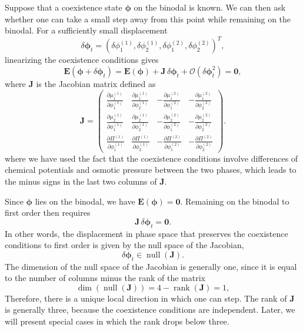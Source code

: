 \documentclass[12pt]{article}
\begin{document}
Suppose that a coexistence state \(\boldsymbol{\phi}\) on the binodal is known. We can then ask whether one can take a small step away from this point while remaining on the binodal.
For a sufficiently small displacement
\[
\delta\boldsymbol{\phi}_t
=
(\delta\phi_1^{(1)}, \delta\phi_2^{(1)}, \delta\phi_1^{(2)}, \delta\phi_2^{(2)})^T,
\]
linearizing the coexistence conditions gives
\begin{equation}
\boldsymbol{E}(\boldsymbol{\phi}+\delta\boldsymbol{\phi}_t)
=
\boldsymbol{E}(\boldsymbol{\phi})
+
\boldsymbol{J}\,\delta\boldsymbol{\phi}_t
+
\mathcal{O}(\delta\boldsymbol{\phi}_t^2)
=
\boldsymbol{0},
\label{eq:binodal_step}
\end{equation}
where \(\boldsymbol{J}\) is the Jacobian matrix defined as
\[
\boldsymbol{J} =
\begin{pmatrix}
\frac{\partial \mu_1^{(1)}}{\partial \phi_1^{(1)}} & \frac{\partial \mu_1^{(1)}}{\partial \phi_2^{(1)}} & -\frac{\partial \mu_1^{(2)}}{\partial \phi_1^{(2)}} & -\frac{\partial \mu_1^{(2)}}{\partial \phi_2^{(2)}}\\
\frac{\partial \mu_2^{(1)}}{\partial \phi_1^{(1)}} & \frac{\partial \mu_2^{(1)}}{\partial \phi_2^{(1)}} & -\frac{\partial \mu_2^{(2)}}{\partial \phi_1^{(2)}} & -\frac{\partial \mu_2^{(2)}}{\partial \phi_2^{(2)}}\\
\frac{\partial \Pi^{(1)}}{\partial \phi_1^{(1)}} & \frac{\partial \Pi^{(1)}}{\partial \phi_2^{(1)}} & -\frac{\partial \Pi^{(2)}}{\partial \phi_1^{(2)}} & -\frac{\partial \Pi^{(2)}}{\partial \phi_2^{(2)}}
\end{pmatrix}.
\]
where we have used the fact that the coexistence conditions involve differences of chemical potentials and osmotic pressure between the two phases, which leads to the minus signs in the last two columns of \(\boldsymbol{J}\).

Since \(\boldsymbol{\phi}\) lies on the binodal, we have \(\boldsymbol{E}(\boldsymbol{\phi})=\boldsymbol{0}\). Remaining on the binodal to first order then requires
\[
\boldsymbol{J}\,\delta\boldsymbol{\phi}_t = \boldsymbol{0}.
\]
In other words, the displacement in phase space that preserves the coexistence conditions to first order is given by the null space of the Jacobian,
\[
\delta\boldsymbol{\phi}_t \in \operatorname{null}(\boldsymbol{J}).
\]
The dimension of the null space of the Jacobian is generally one, since it is equal to the number of columns minus the rank of the matrix
\[
\dim(\operatorname{null}(\boldsymbol{J})) = 4 - \operatorname{rank}(\boldsymbol{J}) = 1,
\]
Therefore, there is a unique local direction in which one can step. The rank of \(\boldsymbol{J}\) is generally three, because the coexistence conditions are independent.
Later, we will present special cases in which the rank drops below three.
\end{document}
